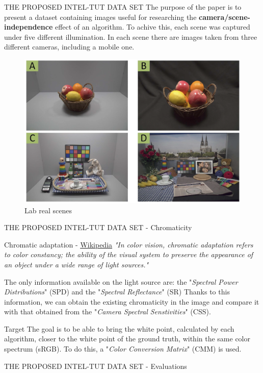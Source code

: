 \documentclass[10pt]{beamer}
\begin{document}
\begin{frame}{THE PROPOSED INTEL-TUT DATA SET}
    The purpose of the paper is to present a dataset containing images useful 
    for researching the {\bfseries{camera/scene-independence}} effect of an algorithm.
    To achive this, each scene was captured under five different illumination. 
    In each scene there are images taken from three different cameras, 
    including a mobile one.
    \begin{figure}[htbp]
        \centering
        \includegraphics[width = 0.6 \linewidth]{images/paper4/lab.png}
        \centering
        \caption{Lab real scenes}
        \label{fig:Lab}
    \end{figure}
\end{frame}

\begin{frame}{THE PROPOSED INTEL-TUT DATA SET - Chromaticity}
    \begin{block}{Chromatic adaptation - \href{https://en.wikipedia.org/wiki/Color_vision}{\underline{Wikipedia}}}
        \emph{"In color vision, chromatic adaptation refers to color constancy; the 
        ability of the visual system to preserve the appearance of an object under 
        a wide range of light sources."}
    \end{block}
    The only information available on the light source are: the "\emph{Spectral 
    Power Distributions}" (SPD) and the "\emph{Spectral Reflectance}" (SR)
    Thanks to this information, we can obtain the existing chromaticity in the image 
    and compare it with that obtained from the "\emph{Camera Spectral Senstivities}" (CSS).
    \begin{block}{Target}
        The goal is to be able to bring the white point, calculated by each algorithm, closer to the white point of the ground truth, within the same color spectrum (sRGB). To do this, a "\emph{Color Conversion Matrix}" (CMM) is used.
    \end{block}
\end{frame}

\begin{frame}{THE PROPOSED INTEL-TUT DATA SET - Evaluations}
    
\end{frame}
    
\end{document}
